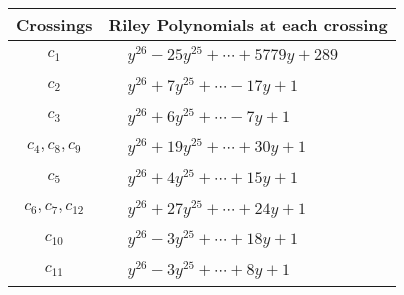 \documentclass[1p]{elsarticle_modified}
\theoremstyle{definition}
\begin{document}
\begin{tabular}{m{50pt}|m{274pt}}
Crossings & \hspace{64pt}Riley Polynomials at each crossing \\
\hline $$\begin{aligned}c_{1}\end{aligned}$$&$\begin{aligned}
&y^{26}-25 y^{25}+\cdots+5779 y+289
\end{aligned}$\\
\hline $$\begin{aligned}c_{2}\end{aligned}$$&$\begin{aligned}
&y^{26}+7 y^{25}+\cdots-17 y+1
\end{aligned}$\\
\hline $$\begin{aligned}c_{3}\end{aligned}$$&$\begin{aligned}
&y^{26}+6 y^{25}+\cdots-7 y+1
\end{aligned}$\\
\hline $$\begin{aligned}c_{4},c_{8},c_{9}\end{aligned}$$&$\begin{aligned}
&y^{26}+19 y^{25}+\cdots+30 y+1
\end{aligned}$\\
\hline $$\begin{aligned}c_{5}\end{aligned}$$&$\begin{aligned}
&y^{26}+4 y^{25}+\cdots+15 y+1
\end{aligned}$\\
\hline $$\begin{aligned}c_{6},c_{7},c_{12}\end{aligned}$$&$\begin{aligned}
&y^{26}+27 y^{25}+\cdots+24 y+1
\end{aligned}$\\
\hline $$\begin{aligned}c_{10}\end{aligned}$$&$\begin{aligned}
&y^{26}-3 y^{25}+\cdots+18 y+1
\end{aligned}$\\
\hline $$\begin{aligned}c_{11}\end{aligned}$$&$\begin{aligned}
&y^{26}-3 y^{25}+\cdots+8 y+1
\end{aligned}$\\
\hline
\end{tabular}\\~\\
\end{document}
